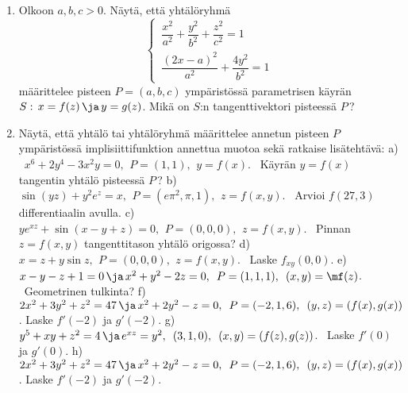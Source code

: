 \begin{enumerate}
\item
Olkoon $a,b,c>0$. Näytä, että yhtälöryhmä
\[
\begin{cases}
\,\dfrac{x^2}{a^2}+\dfrac{y^2}{b^2}+\dfrac{z^2}{c^2}=1 \\[2mm]
\,\dfrac{(2x-a)^2}{a^2}+\dfrac{4y^2}{b^2}=1
\end{cases}
\]
määrittelee pisteen $P=(a,b,c)$ ympäristössä parametrisen käyrän \newline 
$S:\,x=f(z)\,\ja\,y=g(z)$. Mikä on $S$:n tangenttivektori pisteessä $P$\,?

\item
Näytä, että yhtälö tai yhtälöryhmä määrittelee annetun pisteen $P$ ympäristössä 
implisiittifunktion annettua muotoa sekä ratkaise lisätehtävä: \vspace{1mm}\newline
a) \ $x^6+2y^4-3x^2y=0,\,\ P=(1,1),\,\ y=f(x)$. \ Käyrän $y=f(x)$ tangentin yhtälö pisteessä 
$P$\,? \vspace{1mm} \newline
b) \ $\sin(yz)+y^2 e^z=x,\,\ P=(e\pi^2,\pi,1),\,\ z=f(x,y)$. \ Arvioi $f(27,3)$ \newline
differentiaalin avulla. \vspace{1mm}\newline
c) \ $ye^{xz}+\sin(x-y+z)=0,\,\ P=(0,0,0),\,\ z=f(x,y)$. \ Pinnan $z=f(x,y)$ tangenttitason
yhtälö origossa? \vspace{1mm}\newline
d) \ $x=z+y\sin z,\,\ P=(0,0,0),\,\ z=f(x,y)$. \ Laske $f_{xy}(0,0)$. \vspace{1mm}\newline
e) \ $x-y-z+1=0\,\ja\,x^2+y^2-2z=0,\,\ P=(1,1,1),\,\ (x,y)=\mf(z)$. \ 
Geometrinen tulkinta? \vspace{1mm}\newline
f) \ $2x^2+3y^2+z^2=47\,\ja\,x^2+2y^2-z=0,\,\ P=(-2,1,6),\,\ (y,z)=(f(x),g(x))$. Laske
$f'(-2)$ ja $g'(-2)$. \vspace{1mm}\newline
g) \ $y^5+xy+z^2=4\,\ja\,e^{xz}=y^2,\,\ (3,1,0),\,\ (x,y)=(f(z),g(z))$. \ Laske $f'(0)$ ja 
$g'(0)$. \vspace{1mm}\newline
h) \ $2x^2+3y^2+z^2=47\,\ja\,x^2+2y^2-z=0,\,\ P=(-2,1,6),\,\ (y,z)=(f(x),g(x))$. Laske
$f'(-2)$ ja $g'(-2)$.


\end{enumerate}
